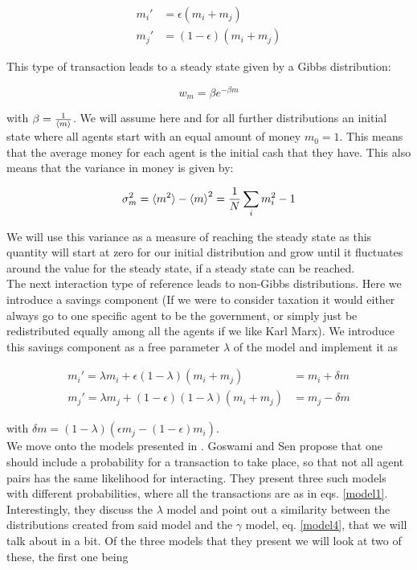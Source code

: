 \documentclass[a4paper,11pt]{article}
\begin{document}
{\begin{align}
m_i' &= \epsilon (m_i + m_j) \\
m_j' &= (1 - \epsilon) (m_i + m_j)
\label{model1}
\end{align}

This type of transaction leads to a steady state given by a Gibbs distribution:

\begin{equation}
w_m = \beta e^{-\beta m}
\label{gibbsDistribution}
\end{equation}

with $\beta = \frac{1}{\braket{m}}$. We will assume here and for all further distributions an initial state where all agents start with an equal amount of money $m_0= 1$. This means that the average money for each agent is the initial cash that they have. This also means that the variance in money is given by:

\begin{equation}
\sigma_m^2 = \braket{m^2} - \braket{m}^2 = \frac{1}{N} \sum_i m_i^2 - 1
\label{variance}
\end{equation} 

We will use this variance as a measure of reaching the steady state as this quantity will start at zero for our initial distribution and grow until it fluctuates around the value for the steady state, if a steady state can be reached. \\

The next interaction type of reference \cite{GibbsVsnon-Gibbs} leads to non-Gibbs distributions. Here we introduce a savings component (If we were to consider taxation it would either always go to one specific agent to be the government, or simply just be redistributed equally among all the agents if we like Karl Marx). We introduce this savings component as a free parameter $\lambda$ of the model and implement it as

\begin{align}
m_i' = \lambda m_i + \epsilon(1 - \lambda) (m_i + m_j) &= m_i + \delta m\\
m_j' = \lambda m_j + (1 - \epsilon)(1 - \lambda) (m_i + m_j) &= m_j - \delta m
\label{model2}
\end{align}

with $\delta m = (1-\lambda)(\epsilon m_j - (1 - \epsilon)m_i)$. \\

We move onto the models presented in \cite{AgentBasedModels}. Goswami and Sen propose that one should include a probability for a transaction to take place, so that not all agent pairs has the same likelihood for interacting. They present three such models with different probabilities, where all the transactions are as in eqs. \ref{model1}. Interestingly, they discuss the $\lambda$ model and point out a similarity between the distributions created from said model and the $\gamma$ model, eq. \ref{model4}, that we will talk about in a bit. Of the three models that they present we will look at two of these, the first one being

}
\end{document}
